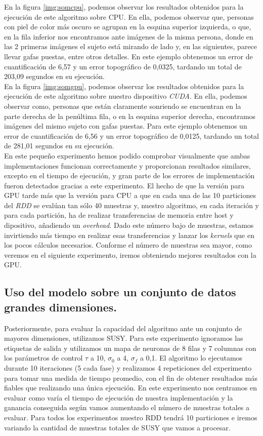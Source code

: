 En la figura \ref{img:somcpu}, podemos observar los resultados obtenidos para la ejecución de este algoritmo sobre CPU. En ella, podemos observar que, personas con piel de color más oscuro se agrupan en la esquina superior izquierda, o que, en la fila inferior nos encontramos ante imágenes de la misma persona, donde en las 2 primeras imágenes el sujeto está mirando de lado y, en las siguientes, parece llevar gafas puestas, entre otros detalles. En este ejemplo obtenemos un error de cuantificación de 6,57 y un error topográfico de 0,0325, tardando un total de 203,09 segundos en su ejecución.\\

En la figura \ref{img:somgpu}, podemos observar los resultados obtenidos para la ejecución de este algoritmo sobre nuestro dispositivo \textit{CUDA}. En ella, podemos observar como, personas que están claramente sonriendo se encuentran en la parte derecha de la penúltima fila, o en la esquina superior derecha, encontramos imágenes del mismo sujeto con gafas puestas. Para este ejemplo obtenemos un error de cuantificación de 6,56 y un error topográfico de 0,0125, tardando un total de 281,01 segundos en su ejecución.\\
	
En este pequeño experimento hemos podido comprobar visualmente que ambas implementaciones funcionan correctamente y proporcionan resultados similares, excepto en el tiempo de ejecución, y gran parte de los errores de implementación fueron detectados gracias a este experimento. El hecho de que la versión para GPU tarde más que la versión para CPU a que en cada una de las 10 particiones del \textit{RDD} se evalúan tan sólo 40 muestras y, nuestro algoritmo, en cada iteración y para cada partición, ha de realizar transferencias de memoria entre host y dipositivo, añadiendo un \textit{overhead}. Dado este número bajo de muestras, estamos invirtiendo más tiempo en realizar esas transferencias y lanzar los \textit{kernels} que en los pocos cálculos necesarios. Conforme el número de muestras sea mayor, como veremos en el siguiente experimento, iremos obteniendo mejores resultados con la GPU. 

\subsection{Uso del modelo sobre un conjunto de datos grandes dimensiones.}
Posteriormente, para evaluar la capacidad del algoritmo ante un conjunto de mayores dimensiones, utilizamos SUSY. Para este experimento ignoramos las etiquetas de salida y utilizamos un mapa de neuronas de 8 filas y 7 columnas con los parámetros de control $\tau$ a 10, $\sigma_0$ a 4, $\sigma_f$ a 0,1. El algoritmo lo ejecutamos durante 10 iteraciones (5 cada fase) y realizamos 4 repeticiones del experimento para tomar una medida de tiempo promedio, con el fin de obtener resultados más fiables que realizando una única ejecución. En este experimento nos centramos en evaluar como varía el tiempo de ejecución de nuestra implementación y la ganancia conseguida según vamos aumentando el número de muestras totales a evaluar. Para todos los experimentos nuestro RDD tendrá 10 particiones e iremos variando la cantidad de muestras totales de SUSY que vamos a procesar.


